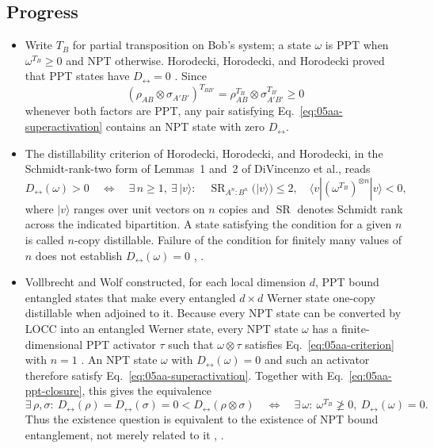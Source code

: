 \subsection*{Progress}

\begin{itemize}
  \item Write $T_B$ for partial transposition on Bob's system; a state $\omega$ is PPT when $\omega^{T_B}\geq0$ and NPT otherwise. Horodecki, Horodecki, and Horodecki proved that PPT states have $D_\leftrightarrow=0$ . Since
\begin{equation}
 (\rho_{AB}\otimes\sigma_{A'B'})^{T_{BB'}}=\rho_{AB}^{T_B}\otimes\sigma_{A'B'}^{T_{B'}}\geq0
 \label{eq:05aa-ppt-closure}
\end{equation}
whenever both factors are PPT, any pair satisfying Eq.~\eqref{eq:05aa-superactivation} contains an NPT state with zero $D_\leftrightarrow$.

  \item The distillability criterion of Horodecki, Horodecki, and Horodecki, in the Schmidt-rank-two form of Lemmas~1 and~2 of DiVincenzo et al., reads
\begin{equation}
 D_{\leftrightarrow}(\omega)>0
 \quad\Longleftrightarrow\quad
 \exists\,n\geq1,\ \exists\,|v\rangle:\quad
 \operatorname{SR}_{A^n:B^n}(|v\rangle)\leq2,
 \quad
 \langle v|(\omega^{T_B})^{\otimes n}|v\rangle<0,
 \label{eq:05aa-criterion}
\end{equation}
where $|v\rangle$ ranges over unit vectors on $n$ copies and $\operatorname{SR}$ denotes Schmidt rank across the indicated bipartition. A state satisfying the condition for a given $n$ is called $n$-copy distillable. Failure of the condition for finitely many values of $n$ does not establish $D_\leftrightarrow(\omega)=0$ , .

  \item Vollbrecht and Wolf constructed, for each local dimension $d$, PPT bound entangled states that make every entangled $d\times d$ Werner state one-copy distillable when adjoined to it. Because every NPT state can be converted by LOCC into an entangled Werner state, every NPT state $\omega$ has a finite-dimensional PPT activator $\tau$ such that $\omega\otimes\tau$ satisfies Eq.~\eqref{eq:05aa-criterion} with $n=1$ . An NPT state $\omega$ with $D_\leftrightarrow(\omega)=0$ and such an activator therefore satisfy Eq.~\eqref{eq:05aa-superactivation}. Together with Eq.~\eqref{eq:05aa-ppt-closure}, this gives the equivalence
\begin{equation}
 \exists\,\rho,\sigma:\ D_\leftrightarrow(\rho)=D_\leftrightarrow(\sigma)=0<D_\leftrightarrow(\rho\otimes\sigma)
 \quad\Longleftrightarrow\quad
 \exists\,\omega:\ \omega^{T_B}\not\geq0,\ D_\leftrightarrow(\omega)=0.
 \label{eq:05aa-equivalence}
\end{equation}
Thus the existence question is equivalent to the existence of NPT bound entanglement, not merely related to it , .


\end{itemize}
